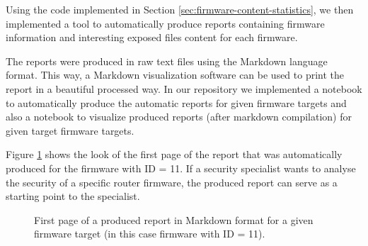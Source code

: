Using the code implemented in Section \ref{sec:firmware-content-statistics}, we then implemented a tool to automatically produce reports containing firmware information and interesting exposed files content for each firmware.

The reports were produced in raw text files using the Markdown language format. This way, a Markdown visualization software can be used to print the report in a beautiful processed way. In our repository \cite{github:c2dc-toso} we implemented a notebook to automatically produce the automatic reports for given firmware targets and also a notebook to visualize produced reports (after markdown compilation) for given target firmware targets.

Figure \ref{fig:automatic-report} shows the look of the first page of the report that was automatically produced for the firmware with ID = 11. If a security specialist wants to analyse the security of a specific router firmware, the produced report can serve as a starting point to the specialist.

\begin{figure}[H]
    \centering
    \caption{First page of a produced report in Markdown format for a given firmware target (in this case firmware with ID = 11).}
    \label{fig:automatic-report}
\end{figure}

